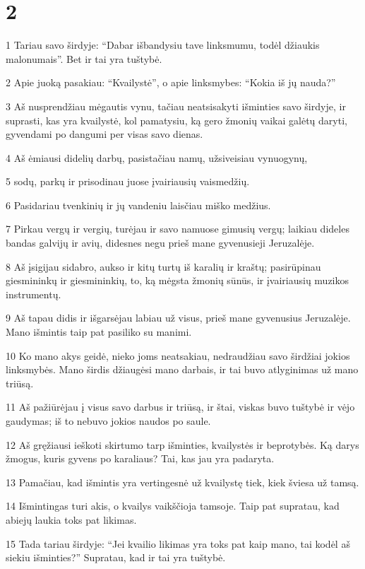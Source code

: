 \chapter{2}


\par 1 Tariau savo širdyje: “Dabar išbandysiu tave linksmumu, todėl džiaukis malonumais”. Bet ir tai yra tuštybė. 
\par 2 Apie juoką pasakiau: “Kvailystė”, o apie linksmybes: “Kokia iš jų nauda?” 
\par 3 Aš nusprendžiau mėgautis vynu, tačiau neatsisakyti išminties savo širdyje, ir suprasti, kas yra kvailystė, kol pamatysiu, ką gero žmonių vaikai galėtų daryti, gyvendami po dangumi per visas savo dienas. 
\par 4 Aš ėmiausi didelių darbų, pasistačiau namų, užsiveisiau vynuogynų, 
\par 5 sodų, parkų ir prisodinau juose įvairiausių vaismedžių. 
\par 6 Pasidariau tvenkinių ir jų vandeniu laisčiau miško medžius. 
\par 7 Pirkau vergų ir vergių, turėjau ir savo namuose gimusių vergų; laikiau dideles bandas galvijų ir avių, didesnes negu prieš mane gyvenusieji Jeruzalėje. 
\par 8 Aš įsigijau sidabro, aukso ir kitų turtų iš karalių ir kraštų; pasirūpinau giesmininkų ir giesmininkių, to, ką mėgsta žmonių sūnūs, ir įvairiausių muzikos instrumentų. 
\par 9 Aš tapau didis ir išgarsėjau labiau už visus, prieš mane gyvenusius Jeruzalėje. Mano išmintis taip pat pasiliko su manimi. 
\par 10 Ko mano akys geidė, nieko joms neatsakiau, nedraudžiau savo širdžiai jokios linksmybės. Mano širdis džiaugėsi mano darbais, ir tai buvo atlyginimas už mano triūsą. 
\par 11 Aš pažiūrėjau į visus savo darbus ir triūsą, ir štai, viskas buvo tuštybė ir vėjo gaudymas; iš to nebuvo jokios naudos po saule. 
\par 12 Aš gręžiausi ieškoti skirtumo tarp išminties, kvailystės ir beprotybės. Ką darys žmogus, kuris gyvens po karaliaus? Tai, kas jau yra padaryta. 
\par 13 Pamačiau, kad išmintis yra vertingesnė už kvailystę tiek, kiek šviesa už tamsą. 
\par 14 Išmintingas turi akis, o kvailys vaikščioja tamsoje. Taip pat supratau, kad abiejų laukia toks pat likimas. 
\par 15 Tada tariau širdyje: “Jei kvailio likimas yra toks pat kaip mano, tai kodėl aš siekiu išminties?” Supratau, kad ir tai yra tuštybė. 

